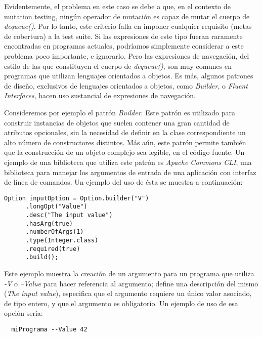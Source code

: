 Evidentemente, el problema en este caso se debe a que, en el contexto de mutation testing, ning\'un operador de mutaci\'on es capaz de mutar el cuerpo de \emph{dequeue()}. Por lo tanto, este criterio falla en imponer cualquier requisito (metas de cobertura) a la test suite. Si las expresiones de este tipo fueran raramente encontradas en programas actuales, podr\'iamos simplemente considerar a este problema poco importante, e ignorarlo. Pero las expresiones de navegaci\'on, del estilo de las que constituyen el cuerpo de \emph{dequeue()}, son muy comunes en programas que utilizan lenguajes orientados a objetos. Es m\'as, algunos patrones de dise\~no, exclusivos de lenguajes orientados a objetos, como \emph{Builder}, o \emph{Fluent Interfaces}, hacen uso sustancial de expresiones de navegaci\'on.

Consideremos por ejemplo el patr\'on \emph{Builder}. Este patr\'on es utilizado para construir instancias de objetos que suelen contener una gran cantidad de atributos opcionales, sin la necesidad de definir en la clase correspondiente un alto n\'umero de constructores distintos. M\'as a\'un, este patr\'on permite tambi\'en que la construcci\'on de un objeto complejo sea legible, en el c\'odigo fuente. Un ejemplo de una biblioteca que utiliza este patr\'on es \emph{Apache Commons CLI}, una biblioteca para manejar los argumentos de entrada de una aplicaci\'on con interfaz de l\'inea de comandos. Un ejemplo del uso de \'esta se muestra a continuaci\'on:
\begin{center}
	\begin{lstlisting}[mathescape=true]
    Option inputOption = Option.builder("V")
      .longOpt("Value")
      .desc("The input value")
      .hasArg(true)
      .numberOfArgs(1)
      .type(Integer.class)
      .required(true)
      .build();
	\end{lstlisting}
\end{center}
Este ejemplo muestra la creaci\'on de un argumento para un programa que utiliza \emph{-V} o \emph{--Value} para hacer referencia al argumento; define una descripci\'on del mismo (\emph{The input value}), especifica que el argumento requiere un \'unico valor asociado, de tipo entero, y que el argumento es obligatorio. Un ejemplo de uso de esa opci\'on ser\'ia:
\begin{lstlisting}
  miPrograma --Value 42
\end{lstlisting}

